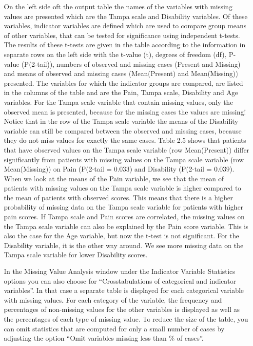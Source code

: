 \documentclass[]{book}
\theoremstyle{definition}
\theoremstyle{definition}
\theoremstyle{definition}
\theoremstyle{remark}
\begin{document}
On the left side oft the output table the names of the variables with
missing values are presented which are the Tampa scale and Disability
variables. Of these variables, indicator variables are defined which are
used to compare group means of other variables, that can be tested for
significance using independent t-tests. The results of these t-tests are
given in the table according to the information in separate rows on the
left side with the t-value (t), degrees of freedom (df), P-value
(P(2-tail)), numbers of observed and missing cases (Present and Missing)
and means of observed and missing cases (Mean(Present) and
Mean(Missing)) presented. The variables for which the indicator groups
are compared, are listed in the columns of the table and are the Pain,
Tampa scale, Disability and Age variables. For the Tampa scale variable
that contain missing values, only the observed mean is presented,
because for the missing cases the values are missing! Notice that in the
row of the Tampa scale variable the means of the Disability variable can
still be compared between the observed and missing cases, because they
do not miss values for exactly the same cases. Table 2.5 shows that
patients that have observed values on the Tampa scale variable (row
Mean(Present)) differ significantly from patients with missing values on
the Tampa scale variable (row Mean(Missing)) on Pain (P(2-tail = 0.033)
and Disability (P(2-tail = 0.039). When we look at the means of the Pain
variable, we see that the mean of patients with missing values on the
Tampa scale variable is higher compared to the mean of patients with
observed scores. This means that there is a higher probability of
missing data on the Tampa scale variable for patients with higher pain
scores. If Tampa scale and Pain scores are correlated, the missing
values on the Tampa scale variable can also be explained by the Pain
score variable. This is also the case for the Age variable, but now the
t-test is not significant. For the Disability variable, it is the other
way around. We see more missing data on the Tampa scale variable for
lower Disability scores.

In the Missing Value Analysis window under the Indicator Variable
Statistics options you can also choose for ``Crosstabulations of
categorical and indicator variables''. In that case a separate table is
displayed for each categorical variable with missing values. For each
category of the variable, the frequency and percentages of non-missing
values for the other variables is displayed as well as the percentages
of each type of missing value. To reduce the size of the table, you can
omit statistics that are computed for only a small number of cases by
adjusting the option ``Omit variables missing less than \% of cases''.
\end{document}
